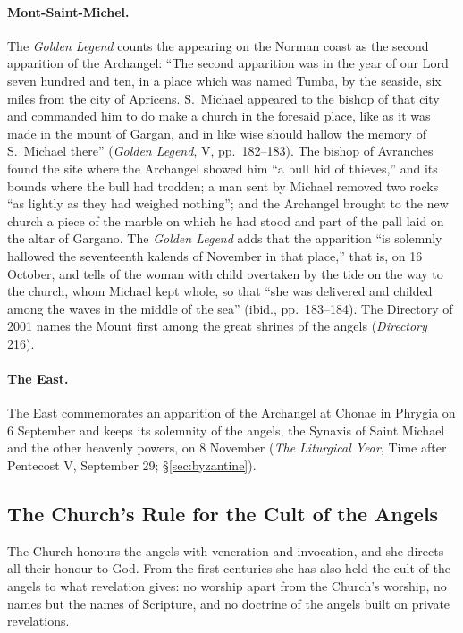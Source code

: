 \paragraph{Mont-Saint-Michel.} The \emph{Golden Legend} counts the
appearing on the Norman coast as the second apparition of the Archangel:
``The second apparition was in the year of our Lord seven hundred and
ten, in a place which was named Tumba, by the seaside, six miles from the
city of Apricens. S.\ Michael appeared to the bishop of that city and
commanded him to do make a church in the foresaid place, like as it was
made in the mount of Gargan, and in like wise should hallow the memory of
S.\ Michael there'' (\emph{Golden Legend}, V, pp.~182--183). The bishop
of Avranches found the site where the Archangel showed him ``a bull hid
of thieves,'' and its bounds where the bull had trodden; a man sent by
Michael removed two rocks ``as lightly as they had weighed nothing''; and
the Archangel brought to the new church a piece of the marble on which he
had stood and part of the pall laid on the altar of Gargano. The \emph{Golden Legend}
adds that the apparition ``is solemnly hallowed the seventeenth kalends of
November in that place,'' that is, on 16 October, and tells of the woman
with child overtaken by the tide on the way to the church, whom Michael
kept whole, so that ``she was delivered and childed among the waves in the
middle of the sea'' (ibid., pp.~183--184). The Directory of 2001 names the
Mount first among the great shrines of the angels (\emph{Directory} 216).

\paragraph{The East.} The East commemorates an apparition of the
Archangel at Chonae in Phrygia on 6 September and keeps its solemnity of
the angels, the Synaxis of Saint Michael and the other heavenly powers, on
8 November (\emph{The Liturgical Year}, Time after Pentecost V, September
29; \S\ref{sec:byzantine}).

\sectionguard
\subsection{The Church's Rule for the Cult of the Angels}

The Church honours the angels with veneration and invocation, and she
directs all their honour to God. From the first centuries she has also
held the cult of the angels to what revelation gives: no worship apart
from the Church's worship, no names but the names of Scripture, and no
doctrine of the angels built on private revelations.

